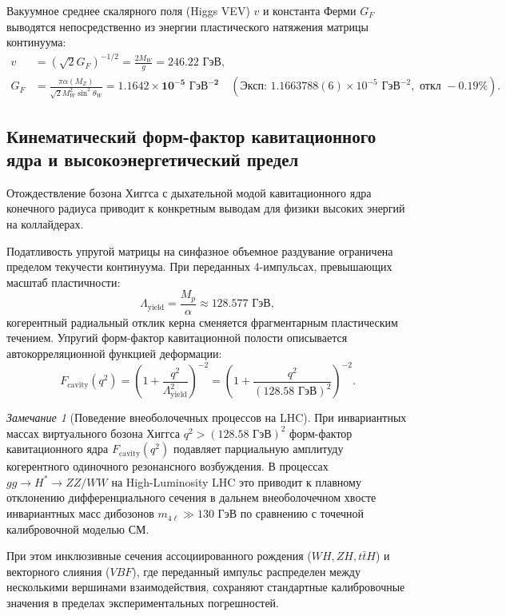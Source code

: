 \documentclass[11pt,a4paper]{article}
\theoremstyle{definition}
\theoremstyle{remark}
\newtheorem{remark}{Замечание}[section]
\begin{document}
Вакуумное среднее скалярного поля (Higgs VEV) $v$ и константа Ферми $G_F$ выводятся непосредственно из энергии пластического натяжения матрицы континуума:
\begin{align}
    v &= \left( \sqrt{2} G_F \right)^{-1/2} = \frac{2 M_W}{g} = \mathbf{246.22\text{ ГэВ}}, \\
    G_F &= \frac{\pi \alpha(M_Z)}{\sqrt{2} M_W^2 \sin^2\theta_W} = \mathbf{1.1642 \times 10^{-5}\text{ ГэВ}^{-2}} \quad (\text{Эксп: } 1.1663788(6) \times 10^{-5}\text{ ГэВ}^{-2}, \text{ откл } -0.19\%).
\end{align}

\subsection{Кинематический форм-фактор кавитационного ядра и высокоэнергетический предел}
Отождествление бозона Хиггса с дыхательной модой кавитационного ядра конечного радиуса приводит к конкретным выводам для физики высоких энергий на коллайдерах.

Податливость упругой матрицы на синфазное объемное раздувание ограничена пределом текучести континуума. При переданных 4-импульсах, превышающих масштаб пластичности:
\begin{equation}
    \Lambda_{\mathrm{yield}} = \frac{M_p}{\alpha} \approx 128.577\text{ ГэВ},
\end{equation}
когерентный радиальный отклик керна сменяется фрагментарным пластическим течением. Упругий форм-фактор кавитационной полости описывается автокорреляционной функцией деформации:
\begin{equation}
    F_{\mathrm{cavity}}(q^2) = \left( 1 + \frac{q^2}{\Lambda_{\mathrm{yield}}^2} \right)^{-2} = \left( 1 + \frac{q^2}{(128.58\text{ ГэВ})^2} \right)^{-2}.
    \label{eq:higgs_form_factor}
\end{equation}

\begin{remark}[Поведение внеоболочечных процессов на LHC]
При инвариантных массах виртуального бозона Хиггса $q^2 > (128.58\text{ ГэВ})^2$ форм-фактор кавитационного ядра $F_{\mathrm{cavity}}(q^2)$ подавляет парциальную амплитуду когерентного одиночного резонансного возбуждения. В процессах $gg \to H^* \to ZZ/WW$ на High-Luminosity LHC это приводит к плавному отклонению дифференциального сечения в дальнем внеоболочечном хвосте инвариантных масс дибозонов $m_{4\ell} \gg 130\text{ ГэВ}$ по сравнению с точечной калибровочной моделью СМ. 

При этом инклюзивные сечения ассоциированного рождения ($WH, ZH, t\bar{t}H$) и векторного слияния ($VBF$), где переданный импульс распределен между несколькими вершинами взаимодействия, сохраняют стандартные калибровочные значения в пределах экспериментальных погрешностей.
\end{remark}
\end{document}

